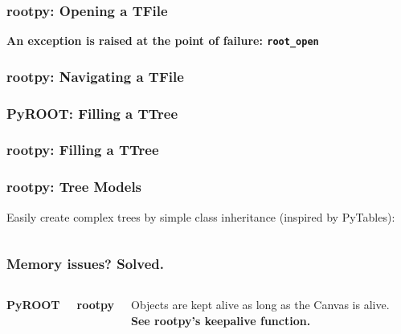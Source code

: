 \documentclass[10pt,professionalfonts,serif,usenames,dvipsnames,svgnames,table]{beamer}
\begin{document}
\begin{frame}[fragile]
    \frametitle{rootpy: Opening a TFile}

    
    \vspace{-.5cm}
    
    \begin{center}
        \vspace{-.5cm}
    {\bf An exception is raised at the point of failure: \verb|root_open|}
    \end{center}
\end{frame}

\begin{frame}[fragile]
    \frametitle{rootpy: Navigating a TFile}
    
    \vspace{-.5cm}
    
\end{frame}

\begin{frame}[fragile]
    \frametitle{PyROOT: Filling a TTree}
    
\end{frame}

\begin{frame}[fragile]
    \frametitle{rootpy: Filling a TTree}
    
\end{frame}

\begin{frame}[fragile]
    \frametitle{rootpy: Tree Models}
    Easily create complex trees by simple class inheritance (inspired by
    PyTables):
    \vspace{-.6cm}
    \begin{columns}
    
    
    \end{columns}
\end{frame}

\begin{frame}[fragile]
    \frametitle{Memory issues? Solved.}
    \begin{columns}
        {\bf PyROOT}
    
        {\bf rootpy}
    
    Objects are kept alive as long as the Canvas is alive. \\
    {\bf See rootpy's keepalive function.}
    \end{columns}
\end{frame}
\end{document}
